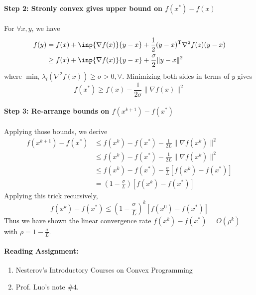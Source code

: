 \paragraph{Step 2: Stronly convex gives upper bound on $f(x^*) - f(x)$}
For $\forall x,y$, we have
\begin{align*}
f(y)&=f(x)+\inp{\nabla f(x)}{y-x}+\frac{1}{2}(y-x)\trans\nabla^2f(z)(y-x)\\
&\ge f(x)+\inp{\nabla f(x)}{y-x}+\frac{\sigma}{2}\|y-x\|^2
\end{align*}
where $\min_i\lambda_i(\nabla^2 f(x))\ge\sigma>0,\forall $. Minimizing both sides in terms of $y$ gives
\[
f(x^*)\ge f(x)-\frac{1}{2\sigma}\|\nabla f(x)\|^2
\]

\paragraph{Step 3: Re-arrange bounds on $f(x^{k+1}) - f(x^*)$}
Applying those bounds, we derive
\begin{align*}
f(x^{k+1}) - f(x^*)&\le f(x^{k}) - f(x^*)-\frac{1}{2L}\|\nabla f(x^k)\|^2\\
&\le  f(x^{k}) - f(x^*)-\frac{1}{2L}\|\nabla f(x^k)\|^2\\
&\le  f(x^{k}) - f(x^*)-\frac{\sigma}{L}[f(x^k) - f(x^*)]\\
&=(1-\frac{\sigma}{L})[f(x^k) - f(x^*)]
\end{align*}
Applying this trick recursively,
\[
f(x^{k}) - f(x^*)\le(1-\frac{\sigma}{L})^k[f(x^0) - f(x^*)]
\]
Thus we have shown the linear convergence rate $f(x^k) - f(x^*)=O(\rho^k)$ with $\rho=1-\frac{\sigma}{L}$.


\paragraph{Reading Assignment: }
\begin{enumerate}
\item
Nesterov's Introductory Courses on Convex Programming
\item
Prof. Luo's note $\#4$.
\end{enumerate}











